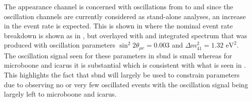 The \nue appearance channel is concerned with oscillations from \numu to \nue and since the oscillation channels are currently considered as stand-alone analyses, an increase in the event rate is expected. This is shown in  where the nominal event rate breakdown is shown as in , but overlayed with and integrated spectrum that was produced with oscillation parameters $\sin^2{2\theta_{\mu e}} = 0.003$ and $\Delta m^2_{41} = 1.32 \text{ eV}^2$. The oscillation signal seen for these parameters in \gls{sbnd} is small whereas for \gls{microboone} and \gls{icarus} it is substantial which is consistent with what is seen in . This highlights the fact that \gls{sbnd} will largely be used to constrain parameters due to observing no or very few oscillated events with the oscillation signal being largely left to \gls{microboone} and \gls{icarus}. 


